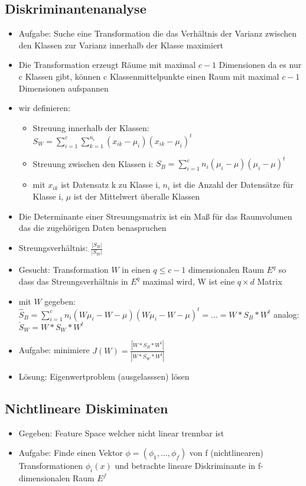 \documentclass{article} %
\begin{document}
	\subsection{Diskriminantenanalyse}
	\begin{itemize}
		\item Aufgabe: Suche eine Transformation die das Verhältnis der Varianz zwischen den Klassen zur Varianz innerhalb der Klasse maximiert
		\item Die Transformation erzeugt Räume mit maximal $c-1$ Dimensionen da es nur c Klassen gibt, können c Klassenmittelpunkte einen Raum mit maximal $c-1$ Dimensionen aufspannen
		\item wir definieren:
		\begin{itemize}
			\item Streuung innerhalb der Klassen: $S_W =\sum_{i=1}^{c}\sum_{k=1}^{n_i}(x_{ik}-\mu_i)(x_{ik}-\mu_i)^t$
			\item Streuung zwischen den Klassen i: $S_B = \sum_{i=1}^{c}n_i(\mu_i-\mu)(\mu_i-\mu)^t$
			\item mit $x_{ik}$ ist Datensatz k zu Klasse i, $n_i$ ist die Anzahl der Datensätze für Klasse i, $\mu$ ist der Mittelwert überalle Klassen
		\end{itemize}
		\item Die Determinante einer Streuungsmatrix ist ein Maß für das Raumvolumen das die zugehörigen Daten benaspruchen
		\item Streungsverhältnis: $\frac{|S_B|}{|S_W|}$
		\item Gesucht: Transformation $W$ in einen $q \leq c-1$ dimensionalen Raum $E^q$ so dass das Streungsverhältnis in $E^q$ maximal wird, W ist eine $q \times d$ Matrix
		\item mit $W$ gegeben: $\hat{S}_B = \sum_{i=1}^{c}n_i(W\mu_i-W-\mu)(W\mu_i-W-\mu)^t = \dots = W*S_B*W^t$ analog: $\hat{S}_W = W*S_W*W^t$
		\item Aufgabe: minimiere $J(W) = \frac{|W*S_B*W^t|}{|W*S_W*W^t|}$
		\item Lösung: Eigenwertproblem (ausgelasssen) lösen
	\end{itemize}
	\subsection{Nichtlineare Diskiminaten}
	\begin{itemize}
		\item Gegeben: Feature Space welcher nicht linear trennbar ist
		\item Aufgabe: Finde einen Vektor $\phi = (\phi_1,\dots,\phi_f)$ von f (nichtlinearen) Transformationen $\phi_i(x)$ und betrachte lineare Diskriminante in f-dimensionalen Raum $E^f$
	\end{itemize}
\end{document}
